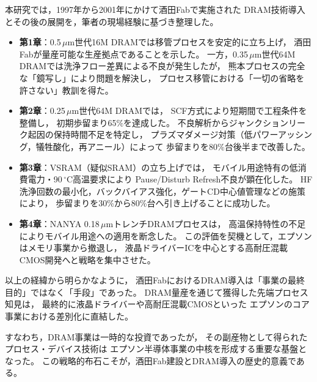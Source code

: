 \documentclass[conference]{IEEEtran}
\begin{document}
本研究では，1997年から2001年にかけて酒田Fabで実施された
DRAM技術導入とその後の展開を，筆者の現場経験に基づき整理した。

\begin{itemize}
  \item \textbf{第1章}：0.5\,$\mu$m世代16M DRAMでは移管プロセスを安定的に立ち上げ，
        酒田Fabが量産可能な生産拠点であることを示した。
        一方，0.35\,$\mu$m世代64M DRAMでは洗浄フロー差異による不良が発生したが，
        熊本プロセスの完全な「鏡写し」により問題を解決し，
        プロセス移管における「一切の省略を許さない」教訓を得た。
  \item \textbf{第2章}：0.25\,$\mu$m世代64M DRAMでは，
        SCF方式により短期間で工程条件を整備し，
        初期歩留まり65\%を達成した。
        不良解析からジャンクションリーク起因の保持時間不足を特定し，
        プラズマダメージ対策（低パワーアッシング，犠牲酸化，再アニール）によって
        歩留まりを80\%台後半まで改善した。
  \item \textbf{第3章}：VSRAM（疑似SRAM）の立ち上げでは，
        モバイル用途特有の低消費電力・90\,$^\circ$C高温要求により
        Pause/Disturb Refresh不良が顕在化した。
        HF洗浄回数の最小化，バックバイアス強化，ゲートCD中心値管理などの施策により，
        歩留まりを30\%から80\%台へ引き上げることに成功した。
  \item \textbf{第4章}：NANYA 0.18\,$\mu$mトレンチDRAMプロセスは，
        高温保持特性の不足によりモバイル用途への適用を断念した。
        この評価を契機として，エプソンはメモリ事業から撤退し，
        液晶ドライバーICを中心とする高耐圧混載CMOS開発へと戦略を集中させた。
\end{itemize}

以上の経緯から明らかなように，
酒田FabにおけるDRAM導入は「事業の最終目的」ではなく「手段」であった。
DRAM量産を通じて獲得した先端プロセス知見は，
最終的に液晶ドライバーや高耐圧混載CMOSといった
エプソンのコア事業における差別化に直結した。

すなわち，DRAM事業は一時的な投資であったが，
その副産物として得られたプロセス・デバイス技術は
エプソン半導体事業の中核を形成する重要な基盤となった。
この戦略的布石こそが，酒田Fab建設とDRAM導入の歴史的意義である。
\end{document}
